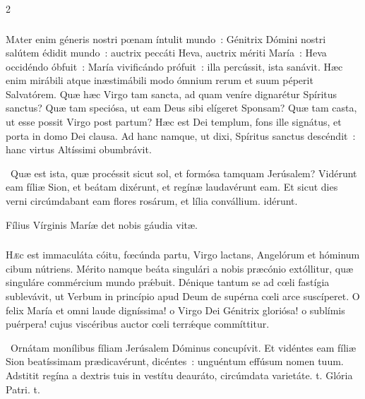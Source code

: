 \documentclass[9pt,twoside]{extarticle}
\begin{document}
\begin{multicols}{2}
\subsubsection*{\center {}}
\lettrine{M}ater enim géneris nostri pœnam íntulit mundo~: Génitrix Dómini nostri salútem édidit mundo~: auctrix peccáti Heva, auctrix mériti María~: Heva occidéndo óbfuit~: María vivificándo prófuit~: illa percússit, ista sanávit. Hæc enim mirábili atque inæstimábili modo ómnium rerum et suum péperit Salvatórem. Quæ hæc Virgo tam sancta, ad quam veníre dignarétur Spíritus sanctus? Quæ tam speciósa, ut eam Deus sibi elígeret Sponsam? Quæ tam casta, ut esse possit Virgo post partum? Hæc est Dei templum, fons ille signátus, et porta in domo Dei clausa. Ad hanc namque, ut dixi, Spíritus sanctus descéndit~: hanc virtus Altíssimi obumbrávit.

\begin{tightlist}{}
\item {}~Quæ est ista, quæ procéssit sicut sol, et formósa tamquam Jerúsalem? \textred{*} Vidérunt eam fíliæ Sion, et beátam dixérunt, et regínæ laudavérunt eam.
 Et sicut dies verni circúmdabant eam flores rosárum, et lília convállium. idérunt.
\item {\small {} Fílius Vírginis Maríæ det nobis gáudia vitæ.}
\end{tightlist}

\subsubsection*{\center {}}
\lettrine{H}æc est immaculáta cóitu, fœcúnda partu, Virgo lactans, Angelórum et hóminum cibum nútriens. Mérito namque beáta singulári a nobis præcónio extóllitur, quæ singuláre commércium mundo prǽbuit. Dénique tantum se ad cœli fastígia sublevávit, ut Verbum in princípio apud Deum de supérna cœli arce suscíperet. O felix María et omni laude digníssima! o Virgo Dei Génitrix gloriósa! o sublímis puérpera! cujus viscéribus auctor cœli terrǽque commíttitur.

\begin{tightlist}{}
\item {}~Ornátam monílibus fíliam Jerúsalem Dóminus concupívit. \textred{*} Et vidéntes eam fíliæ Sion beatíssimam prædicavérunt, dicéntes~: unguéntum effúsum nomen tuum.
 Adstitit regína a dextris tuis in vestítu deauráto, circúmdata varietáte. t. Glória Patri. t.
\end{tightlist}


\end{multicols}
\end{document}
